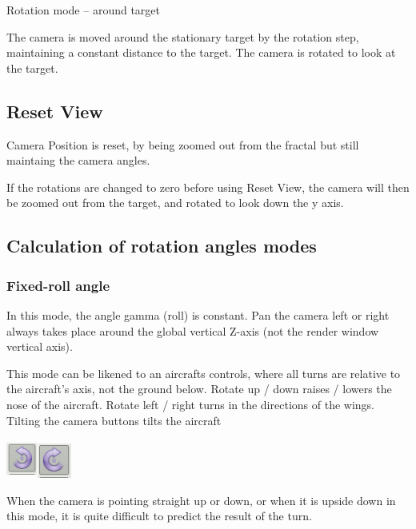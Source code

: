 Rotation mode -- around target

The camera is moved around the stationary target by the rotation step,
maintaining a constant distance to the target. The camera is rotated to
look at the target.

\subsection{Reset View}\label{reset-view}

Camera Position is reset, by being zoomed out from the fractal but still
maintaing the camera angles.

If the rotations are changed to zero before using Reset View, the camera
will then be zoomed out from the target, and rotated to look down the y
axis.

\subsection{Calculation of rotation angles
modes}\label{calculation-of-rotation-angles-modes}

\subsubsection{Fixed-roll angle}\label{fixed-roll-angle}

In this mode, the angle gamma (roll) is constant. Pan the camera left or
right always takes place around the global vertical Z-axis (not the
render window vertical axis).

This mode can be likened to an aircrafts controls, where all turns are
relative to the aircraft's axis, not the ground below. Rotate up / down
raises / lowers the nose of the aircraft. Rotate left / right turns in
the directions of the wings. Tilting the camera buttons tilts the
aircraft

\includegraphics[width=0.40000in,height=0.50000in]{img/manual/media/image16.png}\includegraphics[width=0.45347in,height=0.45347in]{img/manual/media/image17.png}

When the camera is pointing straight up or down, or when it is upside
down in this mode, it is quite difficult to predict the result of the
turn.


